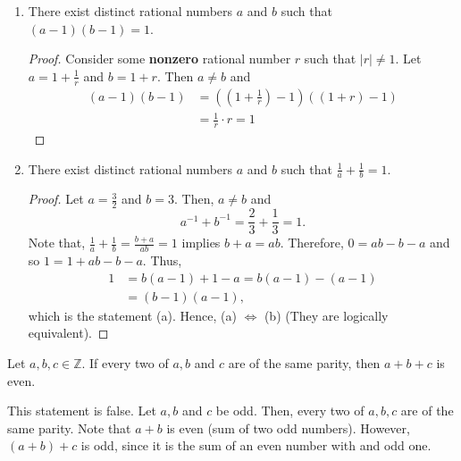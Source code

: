\documentclass[12pt]{article}
\newcommand{\Z}{\mathbb{Z}}
\newenvironment{problem}[2][Problem]{\begin{trivlist}
		\item[\hskip \labelsep {\bfseries #1}\hskip \labelsep {\bfseries #2.}]}{\end{trivlist}}
\newenvironment{solution}[2][Solution]{\begin{trivlist}
		\item[\hskip \labelsep {\bfseries #1}\hskip \labelsep {\bfseries #2.}]}{\end{trivlist}}
\begin{document}
	\begin{problem}{8}
		\begin{enumerate}[label=(\alph*)]
		\item There exist distinct rational numbers $a$ and $b$ such that $(a-1)(b-1)=1$.
			\begin{proof}
				Consider some \textbf{nonzero} rational number $r$ such that $|r|\neq 1$. Let $a = 1+\frac{1}{r}$ and $b=1+r$. Then $a\neq b$ and 
				\begin{align*}
					(a-1)(b-1) &= \left(\left(1+ \frac{1}{r}\right)-1\right) \left(\left(1+r\right)-1\right)\\
					&= \frac{1}{r}\cdot r = 1
				\end{align*} 
			\end{proof}
		
		\item There exist distinct rational numbers $a$ and $b$ such that $\frac{1}{a} + \frac{1}{b}=1$.
			\begin{proof}
				 Let $a=\frac{3}{2}$ and $b=3$. Then, $a\neq b$ and 
				 \begin{equation*}
				 	a^{-1} + b^{-1} = \frac{2}{3} + \frac{1}{3} = 1.
				 \end{equation*}
			 Note that, $\frac{1}{a} + \frac{1}{b} = \frac{b+a}{ab} = 1$ implies $b+a = ab$. Therefore,
			 $0=ab-b-a$ and so $1=1+ab-b-a$. Thus,
			 \begin{align*}
			 	1 &= b(a-1)+1-a = b(a-1) - (a-1)\\
			 	&= (b-1)(a-1),
			 \end{align*}
		 	which is the statement (a). Hence, (a) $\iff$ (b) (They are logically equivalent).
			\end{proof}
		\end{enumerate}
	\end{problem}
	
	\begin{problem}{9}
		Let $a,b,c\in \Z$. If every two of $a, b$ and $c$ are of the same parity, then $a+b+c$ is even.
		\begin{solution}{9}
			This statement is false. Let $a,b$ and $c$ be odd. Then, every two of $a,b,c$ are of the same parity. Note that $a+b$ is even (sum of two odd numbers). However, $(a+b)+c$ is odd, since it is the sum of an even number with and odd one. 
		\end{solution}
	\end{problem}
\end{document}
